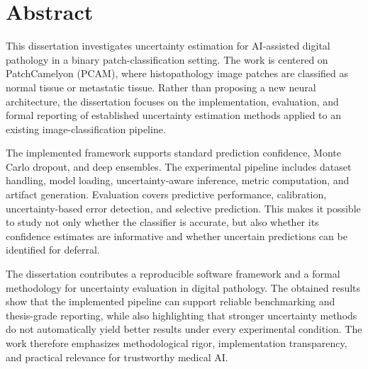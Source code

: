 \chapter*{Abstract}

This dissertation investigates uncertainty estimation for AI-assisted digital pathology in a binary patch-classification setting. The work is centered on PatchCamelyon (PCAM), where histopathology image patches are classified as normal tissue or metastatic tissue. Rather than proposing a new neural architecture, the dissertation focuses on the implementation, evaluation, and formal reporting of established uncertainty estimation methods applied to an existing image-classification pipeline.

The implemented framework supports standard prediction confidence, Monte Carlo dropout, and deep ensembles. The experimental pipeline includes dataset handling, model loading, uncertainty-aware inference, metric computation, and artifact generation. Evaluation covers predictive performance, calibration, uncertainty-based error detection, and selective prediction. This makes it possible to study not only whether the classifier is accurate, but also whether its confidence estimates are informative and whether uncertain predictions can be identified for deferral.

The dissertation contributes a reproducible software framework and a formal methodology for uncertainty evaluation in digital pathology. The obtained results show that the implemented pipeline can support reliable benchmarking and thesis-grade reporting, while also highlighting that stronger uncertainty methods do not automatically yield better results under every experimental condition. The work therefore emphasizes methodological rigor, implementation transparency, and practical relevance for trustworthy medical AI.

